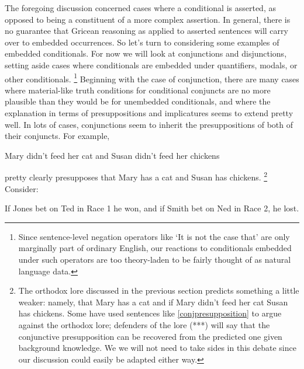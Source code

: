 \documentclass[If.tex]{subfiles}
\begin{document}
The foregoing discussion concerned cases where a conditional is asserted, as opposed to being a constituent of a more complex assertion.  In general, there is no guarantee that Gricean reasoning as applied to asserted sentences will carry over to embedded occurrences.  So let's turn to considering some examples of embedded conditionals.  For now we will look at conjunctions and disjunctions, setting aside cases where conditionals are embedded under quantifiers, modals, or other conditionals.%
\footnote{Since sentence-level negation operators like ‘It is not the case that’ are only marginally part of ordinary English, our reactions to conditionals embedded under such operators are too theory-laden to be fairly thought of as natural language data.}  
Beginning with the case of conjunction, there are many cases where material-like truth conditions for conditional conjuncts are no more plausible than they would be for unembedded conditionals, and where the explanation in terms of presuppositions and implicatures seems to extend pretty well.  In lots of cases, conjunctions seem to inherit the presuppositions of both of their conjuncts.  For example,
\begin{prop}
	\nitem \label{conjpresupposition}
	Mary didn't feed her cat and Susan didn't feed her chickens
\end{prop}
pretty clearly presupposes that Mary has a cat and Susan has chickens.%
\footnote{The orthodox lore discussed in the previous section predicts something a little weaker: namely, that Mary has a cat and if Mary didn't feed her cat Susan has chickens.  Some have used sentences like \ref{conjpresupposition} to argue against the orthodox lore; defenders of the lore (***) will say that the conjunctive presupposition can be recovered from the predicted one given background knowledge.  We we will not need to take sides in this debate since our discussion could easily be adapted either way.}
Consider:
\begin{prop}
	\nitem \label{boringand}
	If Jones bet on Ted in Race 1 he won, and if Smith bet on Ned in Race 2, he lost.
\end{prop}
\end{document}
